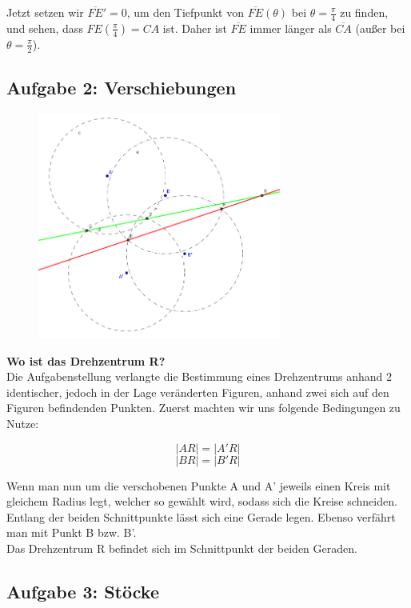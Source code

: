 \documentclass[a4paper,11pt]{article}
\begin{document}
Jetzt setzen wir $\overline{FE}' = 0$, um den Tiefpunkt von $\overline{FE}(\theta)$ bei $\theta = \frac{\pi}{4}$ zu finden, und sehen, dass $FE(\frac{\pi}{4}) = CA$ ist. Daher ist $\overline{FE}$ immer länger als $\overline{CA}$ (au\ss er bei $\theta=\frac{\pi}{2}$).

\subsection{Aufgabe 2: Verschiebungen}

\begin{figure}[htbp] 
        \centering
        \includegraphics[width=8cm]{img/A2_1.png}
\end{figure}

\textbf{Wo ist das Drehzentrum R?} \\
Die Aufgabenstellung verlangte die Bestimmung eines Drehzentrums anhand 2 identischer, jedoch in der Lage 
veränderten Figuren, anhand zwei sich auf den Figuren befindenden Punkten. Zuerst machten wir uns folgende Bedingungen zu Nutze:

\[ |AR| = |A'R| \]
\[ |BR| = |B'R| \]

Wenn man nun um die verschobenen Punkte A und A' jeweils einen Kreis mit gleichem Radius legt, welcher so gewählt wird, sodass sich die Kreise schneiden.\\
Entlang der beiden Schnittpunkte lässt sich eine Gerade legen. Ebenso verfährt man mit Punkt B bzw. B'. \\
Das Drehzentrum R befindet sich im Schnittpunkt der beiden Geraden.

\subsection{Aufgabe 3: St\"ocke}
\end{document}
